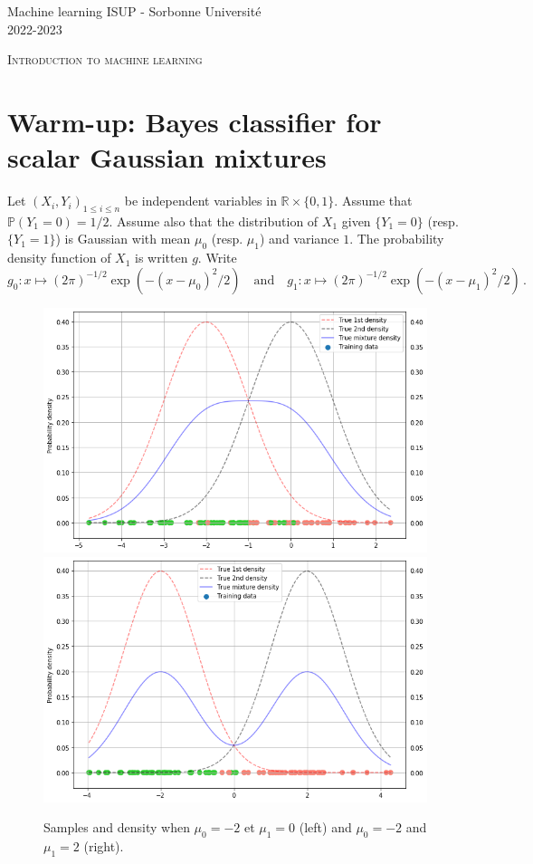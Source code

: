 \documentclass[a4paper,10pt,fleqn]{article}
\newcommand{\eqsp}{\,}
\newcommand{\1}{\ensuremath{\mathbbm{1}}}
\begin{document}
\noindent Machine learning \hfill ISUP - Sorbonne Universit\'e \\
 2022-2023

\noindent\hrulefill

\begin{center}
\textsc{Introduction to machine learning}
\end{center}
\hrulefill

\medskip


\section{Warm-up: Bayes classifier for scalar Gaussian mixtures}
Let $(X_i,Y_i)_{1\leqslant i\leqslant n}$ be independent variables in $\mathbb{R}\times \{0,1\}$. Assume that  $\mathbb{P}(Y_1 = 0) = 1/2$. Assume also that the distribution of $X_1$ given $\{Y_1= 0\}$ (resp. $\{Y_1= 1\}$) is Gaussian with mean $\mu_0$ (resp. $\mu_1$) and variance $1$. The probability density function of $X_1$ is written $g$. Write
$$
g_0: x \mapsto (2\pi)^{-1/2}\exp(-(x-\mu_0)^2/2)\quad\mathrm{and} \quad g_1: x \mapsto (2\pi)^{-1/2}\exp(-(x-\mu_1)^2/2)\eqsp.
$$
\begin{figure}[h!]
\begin{center}
\includegraphics[scale=0.3]{mu0_mum2.png}
\includegraphics[scale=0.3]{mu2_mum2.png}
\caption{Samples and density when   $\mu_0 = -2$ et $\mu_1 = 0$ (left) and $\mu_0 = -2$ and $\mu_1 = 2$ (right).}
\end{center}
\end{figure}
\end{document}
